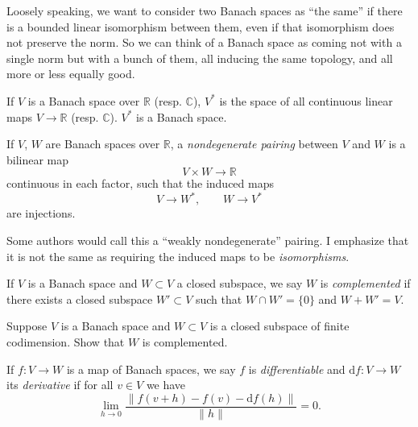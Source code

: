 \documentclass[12pt,letterpaper,reqno]{article}
\numberwithin{equation}{section}
\newcommand{\R}{\ensuremath{\mathbb R}}
\newcommand{\C}{\ensuremath{\mathbb C}}
\newcommand{\de}{\mathrm{d}}
\newcommand{\norm}[1]{\lVert#1\rVert}
\newcommand{\ti}[1]{\textit{#1}}
\begin{document}
Loosely speaking, we want to consider two Banach spaces as
``the same'' if there is a bounded linear isomorphism
between them, even if that isomorphism does not preserve the 
norm. So we can think of a Banach space as coming not with 
a single norm but with a bunch of them, all inducing the 
same topology, and all more or less equally good.

\begin{defn} If $V$ is a Banach space
over $\R$ (resp. $\C$),
$V^*$ is the space of all continuous linear maps $V \to \R$ 
(resp. $\C$). $V^*$ is a Banach space.
\end{defn}

\begin{defn} If $V$, $W$
are Banach spaces over $\R$, a \ti{nondegenerate pairing}
between $V$ and $W$ is a bilinear map
\begin{equation}
  V \times W \to \R
\end{equation}
continuous in each factor,
such that the induced maps
\begin{equation}
  V \to W^*, \qquad W \to V^*
\end{equation}
are injections.
\end{defn}

Some authors would call this a ``weakly nondegenerate'' pairing.
I emphasize that it is not the same as requiring the induced maps
to be \ti{isomorphisms}.

\begin{defn} If $V$ is a Banach space
and $W \subset V$ a closed subspace, we say $W$ is 
\ti{complemented} if there exists a closed subspace $W' \subset V$
such that $W \cap W' = \{0\}$ and $W + W' = V$.
\end{defn}

\begin{exercise} Suppose $V$ is a Banach space and
 $W \subset V$ is a closed subspace of finite codimension.
 Show that $W$ is complemented.
\end{exercise}

\begin{defn}
If $f: V \to W$ is a map of Banach spaces,
we say $f$ is \ti{differentiable} and $\de f: V \to W$ its
\ti{derivative} if for all $v \in V$ we have
\begin{equation}
  \lim_{h \to 0} \frac{\norm{f(v+h) - f(v) - \de f(h)}}{\norm{h}} = 0.
\end{equation}
\end{defn}
\end{document}
